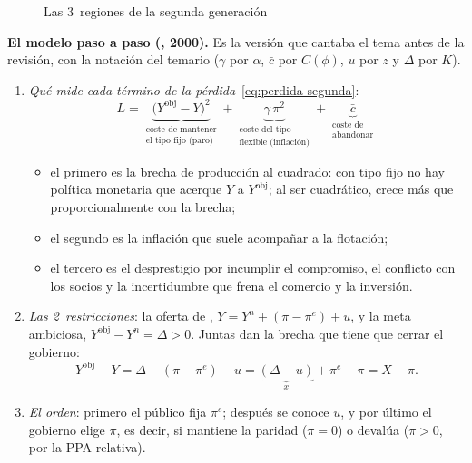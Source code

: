 \documentclass[11pt]{article}
\begin{document}
\begin{figure}[H]
\centering
\caption{Las 3~regiones de la segunda generación}\label{fig:segunda-generacion}
\end{figure}

\begin{anotaciones}
\textbf{El modelo paso a paso (, 2000).} Es la versión que cantaba el tema antes de la revisión, con la notación del temario ($\gamma$ por $\alpha$, $\bar c$ por $C(\phi)$, $u$ por $z$ y $\Delta$ por $K$).
\begin{enumerate}
\item \emph{Qué mide cada término de la pérdida}~\eqref{eq:perdida-segunda}:
  \[
  L=\underbrace{\bigl(Y^{\mathrm{obj}}-Y\bigr)^2}_{\substack{\text{coste de mantener}\\ \text{el tipo fijo (paro)}}}+\underbrace{\gamma\,\pi^2}_{\substack{\text{coste del tipo}\\ \text{flexible (inflación)}}}+\underbrace{\bar c}_{\substack{\text{coste de}\\ \text{abandonar}}}
  \]
  \begin{itemize}
  \item el primero es la brecha de producción al cuadrado: con tipo fijo no hay política monetaria que acerque $Y$ a $Y^{\mathrm{obj}}$; al ser cuadrático, crece más que proporcionalmente con la brecha;
  \item el segundo es la inflación que suele acompañar a la flotación;
  \item el tercero es el desprestigio por incumplir el compromiso, el conflicto con los socios y la incertidumbre que frena el comercio y la inversión.
  \end{itemize}
\item \emph{Las 2~restricciones}: la oferta de , $Y=Y^n+(\pi-\pi^e)+u$, y la meta ambiciosa, $Y^{\mathrm{obj}}-Y^n=\Delta>0$. Juntas dan la brecha que tiene que cerrar el gobierno:
  \[
  Y^{\mathrm{obj}}-Y=\Delta-(\pi-\pi^e)-u=\underbrace{(\Delta-u)}_{x}+\pi^e-\pi=X-\pi .
  \]
\item \emph{El orden}: primero el público fija $\pi^e$; después se conoce $u$, y por último el gobierno elige $\pi$, es decir, si mantiene la paridad ($\pi=0$) o devalúa ($\pi>0$, por la PPA relativa).

\end{enumerate}
\end{anotaciones}
\end{document}
